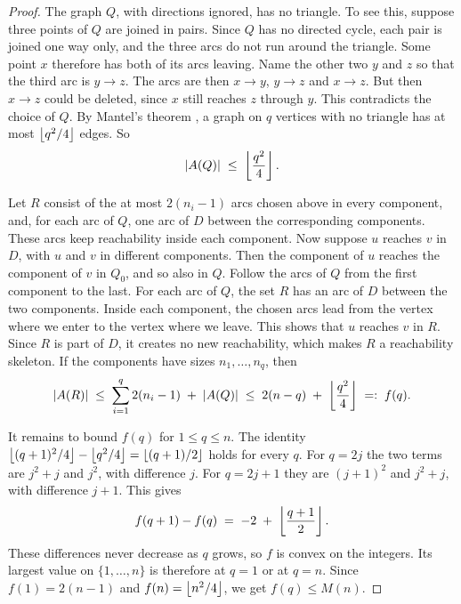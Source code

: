 \begin{proof}
The graph $Q$, with directions ignored, has no triangle.
To see this, suppose three points of $Q$ are joined in pairs.
Since $Q$ has no directed cycle, each pair is joined one way only, and the three arcs do not run around the triangle. Some point $x$ therefore has both of its arcs leaving.
Name the other two $y$ and $z$ so that the third arc is $y \to z$. The arcs are then $x \to y$, $y \to z$ and $x \to z$.
But then $x \to z$ could be deleted, since $x$ still reaches $z$ through $y$.
This contradicts the choice of $Q$.
By Mantel's theorem \cite{Mantel07}, a graph on $q$ vertices with no triangle has at most $\left\lfloor q^2/4 \right\rfloor$ edges. So
\[
    |A(Q)| \;\le\; \left\lfloor \frac{q^2}{4} \right\rfloor.
\]

Let $R$ consist of the at most $2(n_i-1)$ arcs chosen above in every component, and, for each arc of $Q$, one arc of $D$ between the corresponding components.
These arcs keep reachability inside each component.
Now suppose $u$ reaches $v$ in $D$, with $u$ and $v$ in different components.
Then the component of $u$ reaches the component of $v$ in $Q_0$, and so also in $Q$.
Follow the arcs of $Q$ from the first component to the last.
For each arc of $Q$, the set $R$ has an arc of $D$ between the two components.
Inside each component, the chosen arcs lead from the vertex where we enter to the vertex where we leave.
This shows that $u$ reaches $v$ in $R$.
Since $R$ is part of $D$, it creates no new reachability, which makes $R$ a reachability skeleton.
If the components have sizes $n_1, \dots, n_q$, then
\[
    |A(R)| \;\le\; \sum_{i=1}^{q} 2(n_i - 1) \;+\; |A(Q)| \;\le\; 2(n-q) \;+\; \left\lfloor \frac{q^2}{4} \right\rfloor \;=:\; f(q).
\]

It remains to bound $f(q)$ for $1 \le q \le n$.
The identity $\left\lfloor (q+1)^2/4 \right\rfloor - \left\lfloor q^2/4 \right\rfloor = \left\lfloor (q+1)/2 \right\rfloor$ holds for every $q$. For $q=2j$ the two terms are $j^2+j$ and $j^2$, with difference $j$. For $q=2j+1$ they are $(j+1)^2$ and $j^2+j$, with difference $j+1$. This gives
\[
    f(q+1) - f(q) \;=\; -2 \;+\; \left\lfloor \frac{q+1}{2} \right\rfloor.
\]
These differences never decrease as $q$ grows, so $f$ is convex on the integers. Its largest value on $\{1,\dots,n\}$ is therefore at $q=1$ or at $q=n$.
Since $f(1) = 2(n-1)$ and $f(n) = \left\lfloor n^2/4 \right\rfloor$, we get $f(q) \le M(n)$.
\end{proof}

